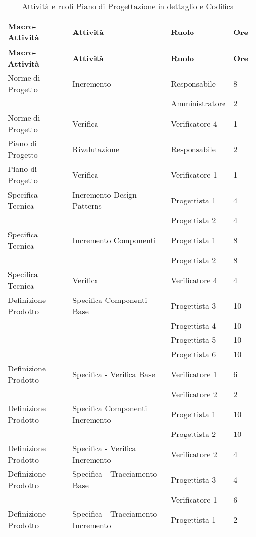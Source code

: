 {{	\renewcommand*{\arraystretch}{1.4}
	\begin{longtable} [c]{| l | l | l | l |}
		\caption{Attività e ruoli Piano di Progettazione in dettaglio e Codifica \label{tab:pianoprogettazdettcodifica}}\\
		 \hline
		 \textbf{Macro-Attività} & \textbf{Attività} & \textbf{Ruolo} & \textbf{Ore}\\
		 \hline
		 \endfirsthead
		 \hline
		 \textbf{Macro-Attività} & \textbf{Attività} & \textbf{Ruolo} & \textbf{Ore}\\
		 \hline
				\endhead
		 \hline
		 \endfoot
		 \hline
		 \endlastfoot
		 Norme di Progetto & Incremento & Responsabile & 8\\
		 &	&	Amministratore & 2\\
		 Norme di Progetto & Verifica & Verificatore 4 & 1 \\
		 Piano di Progetto & Rivalutazione & Responsabile & 2 \\
		 Piano di Progetto & Verifica & Verificatore 1 & 1 \\
		 Specifica Tecnica & Incremento Design Patterns & Progettista 1 & 4\\
		 &	&	Progettista 2 & 4\\
		 Specifica Tecnica & Incremento Componenti & Progettista 1 & 8\\
		 &	&	Progettista 2 & 8\\
		 Specifica Tecnica & Verifica & Verificatore 4 & 4 \\
		 Definizione Prodotto & Specifica Componenti Base & Progettista 3 & 10\\
		 &	&	Progettista 4 & 10\\
		 &	&	Progettista 5 & 10\\
		 &	&	Progettista 6 & 10\\
		 Definizione Prodotto & Specifica - Verifica Base & Verificatore 1 & 6\\
		 &	&	Verificatore 2 & 2\\
		 Definizione Prodotto & Specifica Componenti Incremento & Progettista 1 & 10\\
		 &	&	Progettista 2 & 10\\
		 Definizione Prodotto & Specifica - Verifica Incremento & Verificatore 2 & 4 \\
		 Definizione Prodotto & Specifica - Tracciamento Base & Progettista 3 & 4\\
		 &	&	Verificatore 1 & 6\\
		 Definizione Prodotto & Specifica - Tracciamento Incremento & Progettista 1 & 2\\

\end{longtable}}}
